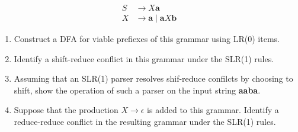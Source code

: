 \documentclass[a4paper]{exam}
\begin{document}
$$\begin{aligned} S & \rightarrow X \mathbf{a} \\ X & \rightarrow \mathbf{a} \mid \mathbf{a} X \mathbf{b} \end{aligned}$$
\begin{enumerate}
\item Construct a DFA for viable prefiexes of this grammar using LR(0) items.
\item Identify a shift-reduce conflict in this grammar under the SLR(1) rules.
\item Assuming that an SLR(1) parser resolves shif-reduce confilcts by choosing to shift, show the operation of such a parser on the input string \textbf{aaba}.
\item Suppose that the production $X\rightarrow \epsilon$ is added to this grammar. Identify a reduce-reduce conflict in the resulting grammar under the SLR(1) rules.
\end{enumerate}
\end{document}
